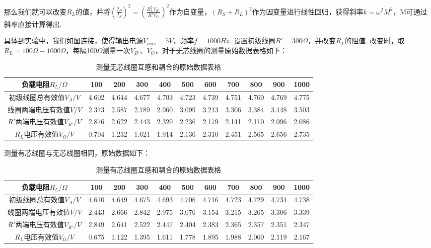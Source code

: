\documentclass[UTF8]{ctexart}
\begin{document}
那么我们就可以改变$R_L$的值，并将$(\frac{I_P}{I_S})^2=(\frac{R_L^2V_{R'}}{R'V_O})^2$作为自变量，$(R_S+R_L)^2$作为因变量进行线性回归，获得斜率$k=\omega^2  M^2 $，M可通过斜率直接计算得出.\par
具体到实验中，我们如图连接，使得输出电源$V_{rms}=5V$，频率$f=1000Hz$. 设置初级线圈$R'=300\Omega$，并改变$R_L$的阻值. 改变时，取$R_L=100\Omega-1000\Omega$，每隔100$\Omega$测量一次$V_{R'}$、${V_O}$，对于无芯线圈的测量原始数据表格如下：
\begin{table}[H]\begin{center}
    \label{biaowu}
    \caption{测量无芯线圈互感和耦合的原始数据表格}
    \begin{tabular}{|c|c|c|c|c|c|c|c|c|c|c|}
        \hline
        
        \hline
        负载电阻$R_L/\Omega$&100&200&300&400&500&600&700&800&900&1000\\
        \hline
        初级线圈总有效值$V_A/V$&4.602&4.644&4.677&4.703&4.723&4.739&4.751&4.760&4.769&4.775\\
        \hline
        线圈两端电压有效值$V/V$&2.373&2.587&2.789&2.960&3.099&3.213&3.306&3.384&3.448&3.503\\
        \hline
        $R'$两端电压有效值$V_{R'}/V$&2.876&2.622&2.443&2.320&2.236&2.179&2.141&2.110&2.096&2.086\\
        \hline
        $R_L$电压有效值$V_O/V$&0.704&1.232&1.621&1.914&2.136&2.310&2.451&2.565&2.656&2.735\\
        \hline
        \end{tabular}
\restoregeometry
\end{center}\end{table}

测量有芯线圈与无芯线圈相同，原始数据如下：
\begin{table}[H]\begin{center}
    \label{biaoliu}
    \caption{测量有芯线圈互感和耦合的原始数据表格}
    \begin{tabular}{|c|c|c|c|c|c|c|c|c|c|c|}
        \hline
        
        \hline
        负载电阻$R_L/\Omega$&100&200&300&400&500&600&700&800&900&1000\\
        \hline
        初级线圈总有效值$V_A/V$&4.610&4.649&4.675&4.693&4.706&4.716&4.723&4.729&4.734&4.738\\
        \hline
        线圈两端电压有效值$V/V$&2.443&2.666&2.842&2.975&3.076&3.154&3.215&3.265&3.306&3.339\\
        \hline
        $R'$两端电压有效值$V_{R'}/V$&2.849&2.641&2.522&2.447&2.404&2.383&2.365&2.357&2.351&2.347\\
        \hline
        $R_L$电压有效值$V_O/V$&0.675&1.122&1.395&1.611&1.778&1.895&1.988&2.060&2.119&2.167\\
        \hline
        \end{tabular}
\restoregeometry
\end{center}\end{table}
\end{document}
